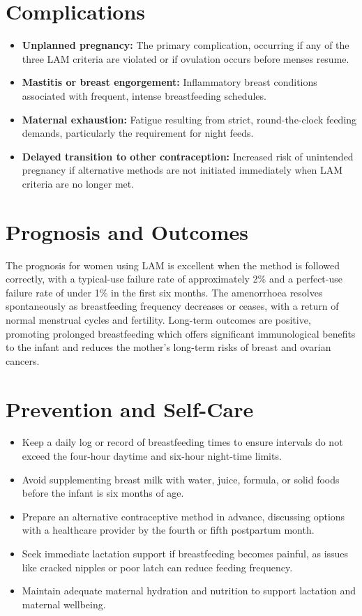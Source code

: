 \section*{Complications}
\begin{itemize}
    \item \textbf{Unplanned pregnancy:} The primary complication, occurring if any of the three LAM criteria are violated or if ovulation occurs before menses resume.
    \item \textbf{Mastitis or breast engorgement:} Inflammatory breast conditions associated with frequent, intense breastfeeding schedules.
    \item \textbf{Maternal exhaustion:} Fatigue resulting from strict, round-the-clock feeding demands, particularly the requirement for night feeds.
    \item \textbf{Delayed transition to other contraception:} Increased risk of unintended pregnancy if alternative methods are not initiated immediately when LAM criteria are no longer met.
\end{itemize}

\section*{Prognosis and Outcomes}
The prognosis for women using LAM is excellent when the method is followed correctly, with a typical-use failure rate of approximately 2\% and a perfect-use failure rate of under 1\% in the first six months. The amenorrhoea resolves spontaneously as breastfeeding frequency decreases or ceases, with a return of normal menstrual cycles and fertility. Long-term outcomes are positive, promoting prolonged breastfeeding which offers significant immunological benefits to the infant and reduces the mother's long-term risks of breast and ovarian cancers.

\section*{Prevention and Self-Care}
\begin{itemize}
    \item Keep a daily log or record of breastfeeding times to ensure intervals do not exceed the four-hour daytime and six-hour night-time limits.
    \item Avoid supplementing breast milk with water, juice, formula, or solid foods before the infant is six months of age.
    \item Prepare an alternative contraceptive method in advance, discussing options with a healthcare provider by the fourth or fifth postpartum month.
    \item Seek immediate lactation support if breastfeeding becomes painful, as issues like cracked nipples or poor latch can reduce feeding frequency.
    \item Maintain adequate maternal hydration and nutrition to support lactation and maternal wellbeing.
\end{itemize}

